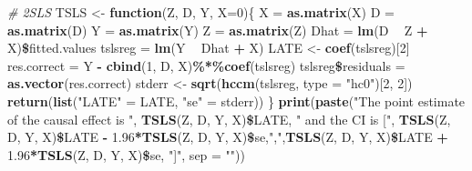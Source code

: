 \documentclass[]{article}
\newenvironment{Shaded}{\begin{snugshade}}{\end{snugshade}}
\newcommand{\KeywordTok}[1]{\textcolor[rgb]{0.13,0.29,0.53}{\textbf{#1}}}
\newcommand{\DataTypeTok}[1]{\textcolor[rgb]{0.13,0.29,0.53}{#1}}
\newcommand{\DecValTok}[1]{\textcolor[rgb]{0.00,0.00,0.81}{#1}}
\newcommand{\FloatTok}[1]{\textcolor[rgb]{0.00,0.00,0.81}{#1}}
\newcommand{\StringTok}[1]{\textcolor[rgb]{0.31,0.60,0.02}{#1}}
\newcommand{\CommentTok}[1]{\textcolor[rgb]{0.56,0.35,0.01}{\textit{#1}}}
\newcommand{\ControlFlowTok}[1]{\textcolor[rgb]{0.13,0.29,0.53}{\textbf{#1}}}
\newcommand{\OperatorTok}[1]{\textcolor[rgb]{0.81,0.36,0.00}{\textbf{#1}}}
\newcommand{\NormalTok}[1]{#1}
\begin{document}
\begin{Shaded}
\begin{Highlighting}[]
\CommentTok{# 2SLS}
\NormalTok{TSLS <-}\StringTok{ }\ControlFlowTok{function}\NormalTok{(Z, D, Y, }\DataTypeTok{X=}\DecValTok{0}\NormalTok{)\{}
\NormalTok{  X =}\StringTok{ }\KeywordTok{as.matrix}\NormalTok{(X)}
\NormalTok{  D =}\StringTok{ }\KeywordTok{as.matrix}\NormalTok{(D)}
\NormalTok{  Y =}\StringTok{ }\KeywordTok{as.matrix}\NormalTok{(Y)}
\NormalTok{  Z =}\StringTok{ }\KeywordTok{as.matrix}\NormalTok{(Z)}
\NormalTok{  Dhat    =}\StringTok{ }\KeywordTok{lm}\NormalTok{(D }\OperatorTok{~}\StringTok{ }\NormalTok{Z }\OperatorTok{+}\StringTok{ }\NormalTok{X)}\OperatorTok{\$}\NormalTok{fitted.values}
\NormalTok{  tslsreg =}\StringTok{ }\KeywordTok{lm}\NormalTok{(Y }\OperatorTok{~}\StringTok{ }\NormalTok{Dhat }\OperatorTok{+}\StringTok{ }\NormalTok{X)}
\NormalTok{  LATE <-}\StringTok{ }\KeywordTok{coef}\NormalTok{(tslsreg)[}\DecValTok{2}\NormalTok{]}
\NormalTok{  res.correct       =}\StringTok{ }\NormalTok{Y }\OperatorTok{-}\StringTok{ }\KeywordTok{cbind}\NormalTok{(}\DecValTok{1}\NormalTok{, D, X)}\OperatorTok{\%*\%}\KeywordTok{coef}\NormalTok{(tslsreg)}
\NormalTok{  tslsreg}\OperatorTok{\$}\NormalTok{residuals =}\StringTok{ }\KeywordTok{as.vector}\NormalTok{(res.correct)}
\NormalTok{  stderr <-}\StringTok{ }\KeywordTok{sqrt}\NormalTok{(}\KeywordTok{hccm}\NormalTok{(tslsreg, }\DataTypeTok{type =} \StringTok{"hc0"}\NormalTok{)[}\DecValTok{2}\NormalTok{, }\DecValTok{2}\NormalTok{])}
  \KeywordTok{return}\NormalTok{(}\KeywordTok{list}\NormalTok{(}\StringTok{"LATE"}\NormalTok{ =}\StringTok{ }\NormalTok{LATE, }\StringTok{"se"}\NormalTok{ =}\StringTok{ }\NormalTok{stderr))}
\NormalTok{\}}
\KeywordTok{print}\NormalTok{(}\KeywordTok{paste}\NormalTok{(}\StringTok{"The point estimate of the causal effect is "}\NormalTok{, }\KeywordTok{TSLS}\NormalTok{(Z, D, Y, X)}\OperatorTok{\$}\NormalTok{LATE, }\StringTok{" and the CI is ["}\NormalTok{, }\KeywordTok{TSLS}\NormalTok{(Z, D, Y, X)}\OperatorTok{\$}\NormalTok{LATE }\OperatorTok{-}\StringTok{ }\FloatTok{1.96}\OperatorTok{*}\KeywordTok{TSLS}\NormalTok{(Z, D, Y, X)}\OperatorTok{\$}\NormalTok{se,}\StringTok{","}\NormalTok{,}\KeywordTok{TSLS}\NormalTok{(Z, D, Y, X)}\OperatorTok{\$}\NormalTok{LATE }\OperatorTok{+}\StringTok{ }\FloatTok{1.96}\OperatorTok{*}\KeywordTok{TSLS}\NormalTok{(Z, D, Y, X)}\OperatorTok{\$}\NormalTok{se, }\StringTok{"]"}\NormalTok{, }\DataTypeTok{sep =} \StringTok{""}\NormalTok{))}
\end{Highlighting}
\end{Shaded}
\end{document}
